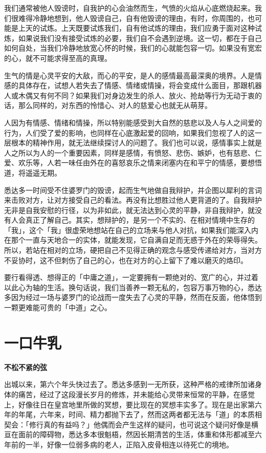 \documentclass[12pt,twoside,openany]{book}
\newcommand{\mt}[1]{\textbullet \textbf{#1}}
\begin{document}
我们通常被他人毁谤时，自我护的心会油然而生，气愤的火焰从心底燃烧起来。我们很难得冷静地想到，他人毁谤自己，自有他毁谤的理由，有时，你周围的，也可能是上天的试炼。上天既要试炼我们，自有他试炼的理由，我们应勇于面对这种试炼，如果说我们没有接受试炼的必要，我们自不会遇到逆境。这一切，都在于自己如何自处，当我们冷静地放宽心怀的时候，我们的心就能包容一切。如果没有宽宏的心，就不可能求得至高的真理。

生气的情是心灵平安的大敌，而心的平安，是人的感情最高最深奥的境界。人是情感的具体存在，试想人若失去了情感、情绪或情操，将会变成什么面目，那跟机器人或木偶又有何不同？如果我们对身边发生的杀人、放火、抢劫等行为无动于衷的话，那么同样的，对东西的怜惜心、对人的慈爱心也就无从萌芽。

人因为有情感、情绪和情操，所以特别能感受到大自然的慈悲以及人与人之间爱的行为，人们受了爱的影响，也同样在心底激起爱的回响，如果我们忽视了人的这一层根本的精神作用，就无法继续探讨人的问题了。我们也可以说，感情事实上就是人之所以为人的一个重要因素，同样是感情，有愤怒、悲伤、嫉妒，也有慈悲、仁爱、欢乐等，人若一味任由外在的喜怒哀乐之情来闭塞内在和平宁的情感，要想悟道，将遥遥无期。

悉达多一时间受不住婆罗门的毁谤，起而生气地做自我辩护，并企图以犀利的言词来击败对方，让对方接受自己的看法。再没有比想胜过他人更背道的了。自我辩护无非是自我安慰的行径，以为非如此，就无法达到心灵的平静，非自我辩护，就没有人会真正了解自己。其实，想辩护的，是另一个不实的、在相对情境中生存的「我」，这个「我」很虚荣地想站在自己的立场来与他人对抗，如果我们能深入内在那个一直与天地合一的实体，就能发现，它自满自足而无惑于外在的荣辱得失。所以，若站在相对的立场，硬把自己不见得正确的观念与感受传递给对方，当对方不妥协时，这不但刺伤了自己的心，也在对方的心上留下了难以磨灭的烙印。

要行看得透、想得正的「中庸之道」，一定要拥有一颗绝对的、宽广的心，并过着以此心为轴的生活。换句话说，我们当善养一颗无私的，包容万事万物的心，悉达多因为经过一场与婆罗门的论战而一度失去了心灵的平静，然而在反面，他体悟到一颗更难能可贵的「中道」之心。

\section{一口牛乳}\label{sec1.9}

\mt{不松不紧的弦}

出城以来，第六个年头快过去了。悉达多感到一无所获，这种严格的戒律所加诸身体的痛苦，经过了这段漫长岁月的修炼，并未能给心灵带来恒常的平静，在感觉上，好像往日在皇宫地里所做的冥想，要比现在的冥想丰实多了。现在是出家第六年的年尾，六年来，时间、精力都抛下去了，然而这两者都无法与「道」的本质相契会：「修行真的有益吗？」他偶而会产生这样的疑问，也可说这个疑问好像是横亘在面前的障碍物，悉达多本很魁梧，然因长期清苦的生活，体重和体形都减至六年前的一半，好像一位弱多病的老人，正陷入皮骨相连以待死亡的境地。
\end{document}
